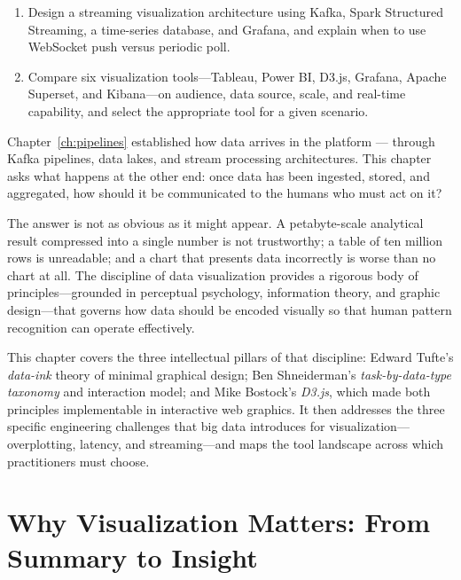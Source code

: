 \begin{chapterlearning}
\begin{enumerate}
        query response on billion-row fact tables, and identify the latency
        versus freshness trade-off.
  \item Design a streaming visualization architecture using Kafka, Spark
        Structured Streaming, a time-series database, and Grafana, and
        explain when to use WebSocket push versus periodic poll.
  \item Compare six visualization tools---Tableau, Power BI, D3.js,
        Grafana, Apache Superset, and Kibana---on audience, data source,
        scale, and real-time capability, and select the appropriate tool
        for a given scenario.
\end{enumerate}
\end{chapterlearning}

\bigskip

Chapter~\ref{ch:pipelines} established how data arrives in the platform ---
through Kafka pipelines, data lakes, and stream processing architectures.
This chapter asks what happens at the other end: once data has been
ingested, stored, and aggregated, how should it be communicated to the
humans who must act on it?

The answer is not as obvious as it might appear. A petabyte-scale analytical
result compressed into a single number is not trustworthy; a table of ten
million rows is unreadable; and a chart that presents data incorrectly is
worse than no chart at all. The discipline of data visualization provides
a rigorous body of principles---grounded in perceptual psychology,
information theory, and graphic design---that governs how data should be
encoded visually so that human pattern recognition can operate effectively.

This chapter covers the three intellectual pillars of that discipline:
Edward Tufte's \emph{data-ink} theory of minimal graphical design;
Ben Shneiderman's \emph{task-by-data-type taxonomy} and interaction model;
and Mike Bostock's \emph{D3.js}, which made both principles implementable
in interactive web graphics. It then addresses the three specific engineering
challenges that big data introduces for visualization---overplotting, latency,
and streaming---and maps the tool landscape across which practitioners
must choose.

\section{Why Visualization Matters: From Summary to Insight}
\label{sec:viz-why}

